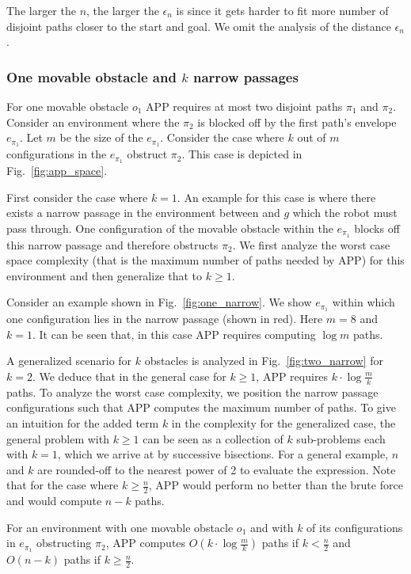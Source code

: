 \documentclass[a4paper]{report}
\begin{document}
The larger the $n$, the larger the $\epsilon_n$ is since it gets harder to fit more number of disjoint paths closer to the start and goal. We omit the analysis of the distance $\epsilon_n$.

\subsubsection{One movable obstacle and $k$ narrow passages}
For one movable obstacle $o_1$ APP requires at most two disjoint paths $\pi_1$ and $\pi_2$. Consider an environment where the $\pi_2$ is blocked off by the first path's envelope $e_{\pi_1}$. Let $m$ be the size of the $e_{\pi_1}$. Consider the case where $k$ out of $m$ configurations in the $e_{\pi_1}$ obstruct $\pi_2$. This case is depicted in Fig.~\ref{fig:app_space}.

First consider the case where $k=1$. An example for this case is where there exists a narrow passage in the environment between \Sstart and $g$ which the robot must pass through. One configuration of the movable obstacle within the $e_{\pi_1}$ blocks off this narrow passage and therefore obstructs $\pi_2$. We first analyze the worst case space complexity (that is the maximum number of paths needed by APP) for this environment and then generalize that to $k \geq 1$.

Consider an example shown in Fig.~\ref{fig:one_narrow}. We show $e_{\pi_1}$ within which one configuration lies in the narrow passage (shown in red). Here $m=8$ and $k=1$. It can be seen that, in this case APP requires computing $\log m$ paths.

A generalized scenario for $k$ obstacles is analyzed in Fig.~\ref{fig:two_narrow} for $k = 2$. We deduce that in the general case for $k \geq 1$, APP requires $k \cdot \log\frac{m}{k}$ paths. To analyze the worst case complexity, we position the narrow passage configurations such that APP computes the maximum number of paths. To give an intuition for the added term $k$ in the complexity for the generalized case, the general problem with $k \geq 1$ can be seen as a collection of $k$ sub-problems each with $k = 1$, which we arrive at by successive bisections. For a general example, $n$ and $k$ are rounded-off to the nearest power of 2 to evaluate the expression. Note that for the case where $k \geq \frac{n}{2}$, APP would perform no better than the brute force and would compute $n-k$ paths. 

\vspace{2mm}
\begin{lemma}
For an environment with one movable obstacle $o_1$ and with $k$ of its configurations in $e_{\pi_1}$ obstructing $\pi_2$, APP computes $O(k \cdot \log \frac{m}{k})$ paths if $k < \frac{n}{2}$ and $O(n-k)$ paths if $k \geq \frac{n}{2}$.
\end{lemma}
\end{document}
